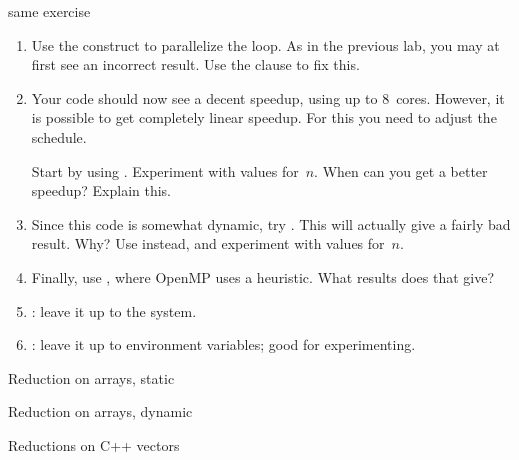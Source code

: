 \begin{exerciseframe}[pi]
  \footnotesize
  
\end{exerciseframe}

\begin{exerciseframe}[piadapt]
  \footnotesize
  
\end{exerciseframe}

\begin{numberedframe}{same exercise}
  \begin{enumerate}
  \item Use the  construct to parallelize the loop.
    As in the previous lab, you may at first see an incorrect result.
    Use the  clause to fix this.
  \item Your code should now see a decent speedup, using up to 8~cores.
    However, it is possible to get completely linear speedup. For this
    you need to adjust the schedule.

    Start by using . Experiment with values
    for~$n$.  When can you get a better speedup? Explain this.
  \item Since this code is somewhat dynamic, try .
    This will actually give a fairly bad result. Why?  Use
     instead, and experiment with values
    for~$n$.
  \item Finally, use , where OpenMP uses a
    heuristic.  What results does that give?
  \item {} : leave it up to the system.
  \item {} : leave it up to environment variables;
    good for experimenting.
  \end{enumerate}
\end{numberedframe}

\begin{numberedframe}{Reduction on arrays, static}
\end{numberedframe}

\begin{numberedframe}{Reduction on arrays, dynamic}
\end{numberedframe}

\begin{cxx}
\begin{numberedframe}{Reductions on C++ vectors}
  
\end{numberedframe}
\end{cxx}

